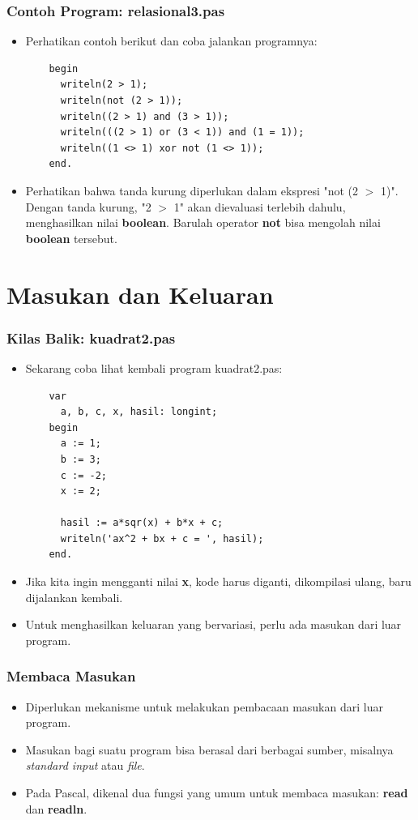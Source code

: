 \begin{frame}[fragile]
\frametitle{Contoh Program: relasional3.pas}
\begin{itemize}
  \item Perhatikan contoh berikut dan coba jalankan programnya:
  \begin{lstlisting}
    begin
      writeln(2 > 1);
      writeln(not (2 > 1));
      writeln((2 > 1) and (3 > 1));
      writeln(((2 > 1) or (3 < 1)) and (1 = 1));
      writeln((1 <> 1) xor not (1 <> 1));
    end.
  \end{lstlisting}
  \item Perhatikan bahwa tanda kurung diperlukan dalam ekspresi "not (2 $>$ 1)". Dengan tanda kurung, "2 $>$ 1" akan dievaluasi terlebih dahulu, menghasilkan nilai \textbf{boolean}. Barulah operator \textbf{not} bisa mengolah nilai \textbf{boolean} tersebut.
\end{itemize}
\end{frame}

\section{Masukan dan Keluaran}
\frame{\sectionpage}

\begin{frame}[fragile]
\frametitle{Kilas Balik: kuadrat2.pas}
\begin{itemize}
  \item Sekarang coba lihat kembali program kuadrat2.pas:
  \begin{lstlisting}
    var
      a, b, c, x, hasil: longint;
    begin
      a := 1;
      b := 3;
      c := -2;
      x := 2;

      hasil := a*sqr(x) + b*x + c;
      writeln('ax^2 + bx + c = ', hasil);
    end.
  \end{lstlisting}
  \item Jika kita ingin mengganti nilai \textbf{x}, kode harus diganti, dikompilasi ulang, baru dijalankan kembali.
  \item Untuk menghasilkan keluaran yang bervariasi, perlu ada \newline masukan dari luar program.
\end{itemize}
\end{frame}

\begin{frame}
\frametitle{Membaca Masukan}
\begin{itemize}
  \item Diperlukan mekanisme untuk melakukan pembacaan masukan dari luar program.
  \item Masukan bagi suatu program bisa berasal dari berbagai sumber, misalnya \textit{standard input} atau \textit{file}.
  \item Pada Pascal, dikenal dua fungsi yang umum untuk membaca masukan: \alert{\textbf{read}} dan \alert{\textbf{readln}}.
\end{itemize}
\end{frame}

